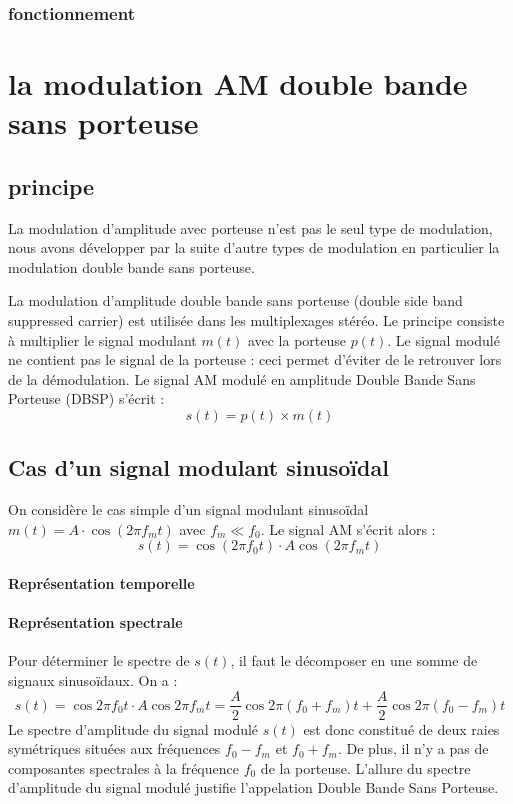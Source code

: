 \documentclass[12pt,a4paper,hidelinks,oneside]{book}
\begin{document}
\subsubsection*{fonctionnement}

\section{la modulation AM double bande sans porteuse}

\label{la modulation AM double bande sans porteuse}

\subsection{principe}
La modulation d'amplitude avec porteuse n'est pas le seul type de modulation, nous avons développer par la suite d'autre types de modulation en particulier la modulation double bande sans porteuse.

La modulation d'amplitude double bande sans porteuse (double side band suppressed carrier) est utilisée dans les multiplexages stéréo.
Le principe consiste à multiplier le signal modulant $m(t)$ avec la porteuse $p(t)$.
Le signal modulé ne contient pas le signal de la porteuse : ceci permet d'éviter
de le retrouver lors de la démodulation.
Le signal AM modulé en amplitude Double Bande Sans Porteuse (DBSP) s’écrit :
\begin{equation}
s(t)=p(t) \times m(t)
\end{equation}

\subsection{Cas d’un signal modulant sinusoïdal}

On considère le cas simple d'un signal modulant sinusoïdal $m(t)=A \cdot \cos \left(2 \pi f_{m} t\right)$ avec $f_{m} \ll f_{0}$. Le signal AM
s’écrit alors :
\begin{equation}
s(t)=\cos \left(2 \pi f_{0} t\right) \cdot A \cos \left(2 \pi f_{m} t\right)
\end{equation}
\paragraph{Représentation temporelle}
\paragraph{Représentation spectrale}
Pour déterminer le spectre de $s(t)$, il faut le décomposer en une somme de signaux sinusoïdaux. On a :
\begin{equation}
s(t)=\cos 2 \pi f_{0} t \cdot A \cos 2 \pi f_{m} t=\frac{A}{2} \cos 2 \pi\left(f_{0}+f_{m}\right) t+\frac{A}{2} \cos 2 \pi\left(f_{0}-f_{m}\right)t
\end{equation}
Le spectre d’amplitude du signal modulé $s(t)$ est donc constitué de deux raies symétriques situées aux
fréquences $f_{0}-f_{m}$ et $f_{0}+f_{m}$. De plus, il n’y a pas de composantes spectrales à la fréquence $f_{0}$ de la
porteuse. L’allure du spectre d’amplitude du signal modulé justifie l’appelation Double Bande Sans
Porteuse.
\end{document}
